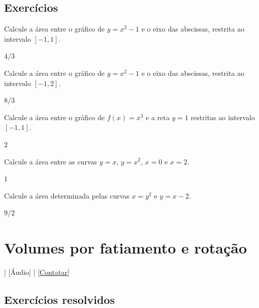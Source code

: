 \subsection*{Exercícios}

\begin{exer}
  Calcule a área entre o gráfico de $y = x^2-1$ e o eixo das abscissas, restrita ao intervalo $[-1, 1]$.
\end{exer}
\begin{resp}
  $4/3$
\end{resp}

\begin{exer}
  Calcule a área entre o gráfico de $y = x^2-1$ e o eixo das abscissas, restrita ao intervalo $[-1, 2]$.
\end{exer}
\begin{resp}
  $8/3$
\end{resp}

\begin{exer}
  Calcule a área entre o gráfico de $f(x)=x^3$ e a reta $y=1$ restritas ao intervalo $[-1,1]$.
\end{exer}
\begin{resp}
  $2$
\end{resp}

\begin{exer}
  Calcule a área entre as curvas $y=x$, $y=x^2$, $x=0$ e $x=2$.
\end{exer}
\begin{resp}
  $1$
\end{resp}

\begin{exer}
  Calcule a área determinada pelas curvas $x=y^2$ e $y = x - 2$.
\end{exer}
\begin{resp}
  $9/2$
\end{resp}

\section{Volumes por fatiamento e rotação}\label{cap_apint_sec_volfat}

\begin{flushright}
  [Vídeo] | [Áudio] | \href{https://phkonzen.github.io/notas/contato.html}{[Contatar]}
\end{flushright}

\emconstrucao

\subsection*{Exercícios resolvidos}

